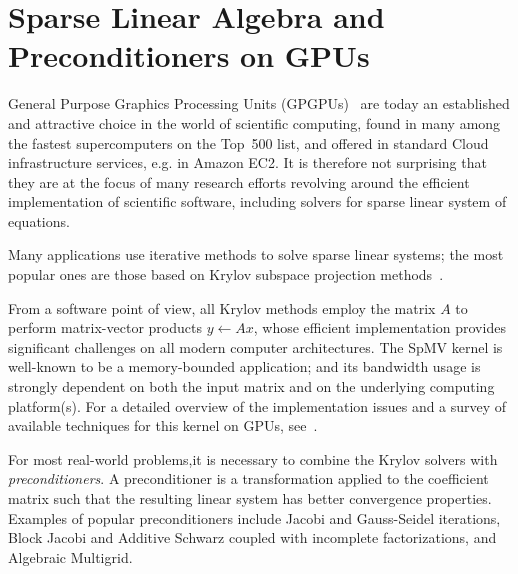\section{Sparse Linear Algebra and Preconditioners on GPUs}

General Purpose Graphics Processing Units (GPGPUs)~\cite{Luebke06}  
are today an established and attractive choice in the world of
scientific computing, found in many among the fastest supercomputers
on the Top~500 list, and offered in standard Cloud infrastructure
services, e.g. in  Amazon EC2. It is therefore not surprising that
they are at the focus of many research efforts revolving around the
efficient implementation of scientific software, including solvers for
sparse linear system of equations. 

Many applications use iterative methods to solve sparse linear
systems;  the most popular ones are those based on  Krylov subspace 
projection methods~\cite{MR1990645}. 

From a  software point of view, all Krylov methods employ the matrix $A$ 
to perform matrix-vector products  $y\gets Ax$, whose efficient
implementation provides significant challenges on all modern computer
architectures. 
The SpMV kernel is well-known to be a memory-bounded application;
and  its bandwidth usage  is strongly dependent on both the input
matrix and on the underlying computing platform(s). For a detailed
overview of the implementation issues and a survey of available
techniques for this kernel on GPUs, see~\cite{Filippone:2017:SMM:3034774.3017994}.   

For most real-world problems,it is necessary to combine the Krylov
solvers with  \emph{preconditioners}. A preconditioner is a
transformation applied to the coefficient  matrix such that the
resulting linear system has better convergence properties. Examples of
popular preconditioners include Jacobi and Gauss-Seidel iterations,
Block Jacobi and Additive Schwarz coupled with incomplete
factorizations,  and Algebraic Multigrid. 

